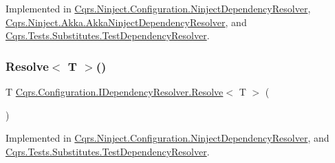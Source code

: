 Implemented in \hyperlink{classCqrs_1_1Ninject_1_1Configuration_1_1NinjectDependencyResolver_aef2a2be58a2562a349572e9946cd2930}{Cqrs.\+Ninject.\+Configuration.\+Ninject\+Dependency\+Resolver}, \hyperlink{classCqrs_1_1Ninject_1_1Akka_1_1AkkaNinjectDependencyResolver_adace29de71f10e34e952bd41e48106a6}{Cqrs.\+Ninject.\+Akka.\+Akka\+Ninject\+Dependency\+Resolver}, and \hyperlink{classCqrs_1_1Tests_1_1Substitutes_1_1TestDependencyResolver_a05767824475ea6affbf6f70cf5b1fd06}{Cqrs.\+Tests.\+Substitutes.\+Test\+Dependency\+Resolver}.

\mbox{\label{interfaceCqrs_1_1Configuration_1_1IDependencyResolver_a9dc7694a365209a5ef05270a7cfa7b6b}} 
\subsubsection{\texorpdfstring{Resolve$<$ T $>$()}{Resolve< T >()}}
{\footnotesize\ttfamily T \hyperlink{interfaceCqrs_1_1Configuration_1_1IDependencyResolver_aa455096b7b94fc1d64904bc67830ec06}{Cqrs.\+Configuration.\+I\+Dependency\+Resolver.\+Resolve}$<$ T $>$ (\begin{DoxyParamCaption}{ }\end{DoxyParamCaption})}



Implemented in \hyperlink{classCqrs_1_1Ninject_1_1Configuration_1_1NinjectDependencyResolver_a35cbb03e98326a3d10ba86c427148b3c}{Cqrs.\+Ninject.\+Configuration.\+Ninject\+Dependency\+Resolver}, and \hyperlink{classCqrs_1_1Tests_1_1Substitutes_1_1TestDependencyResolver_a67090a882241fa6a881d49c91c95cad7}{Cqrs.\+Tests.\+Substitutes.\+Test\+Dependency\+Resolver}.

